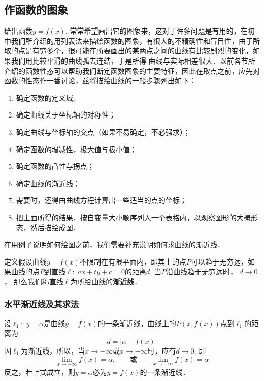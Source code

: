     \subsection{作函数的图象}
    给出函数$y=f(x)$, 常常希望画出它的图象来，这对于许多问题是有用的，在初中我们所介绍的用列表法来描绘函数的图象，有很大的不精确性和盲目性，由于所取的点是有穷多个，很可能在所要画出的某两点之间的曲线有比较剧烈的变化，如果我们用比较平滑的曲线弧去连结，于是所得
    曲线与实际相差很大．以前各节所介绍的函数性态可以帮助我们断定函数图象的主要特征，因此在取点之前，应先对函数的性态作一番讨论，兹将描绘曲线的一般步骤列出如下：
    
    \begin{enumerate}
    \item 确定函数的定义域;
    \item 确定曲线关于坐标轴的对称性；
    \item 确定曲线与坐标轴的交点（如果不易确定，不必强求）；
    \item 确定函数的增减性，极大值与极小值；
    \item 确定函数的凸性与拐点；
    \item 确定曲线的渐近线；
    \item 需要时，还得由曲线方程计算出一些适当的点的坐标；
    \item 把上面所得的结果，按自变量大小顺序列入一个表格内，以观察图形的大概形态，然后描绘成图．
    \end{enumerate}
    
    在用例子说明如何绘图之前，我们需要补充说明如何求曲线的渐近线．
    
    \begin{blk}
        {定义}假设曲线$y=f(x)$不限制在有限平面内，即其上的点$P$可以趋于无穷远，如果曲线的点$P$到直线$\ell:\; ax+ty+c=0$的距离$d$, 当$P$沿曲线趋于无穷远时，
        $d\to 0$，
        那么我们称直线$\ell$为所给曲线的\textbf{渐近线}．
    \end{blk}
    
    \subsubsection{水平渐近线及其求法}
    
    设$\ell_1:\; y=\alpha$是曲线$y=f(x)$的一条渐近线，曲线上的$P(x,f(x))$点到$\ell_1$的距离为
    \[d=|\alpha-f(x)|\]
    因$\ell_1$为渐近线，所以，当$x\to +\infty$或$x\to -\infty$时，应有$d\to 0$, 即
    \[\lim_{x\to+\infty}f(x)=\alpha,\qquad \text{或}\qquad \lim_{x\to -\infty}f(x)=\alpha\]
    反之，若上式成立，则$y=\alpha$必为$y=f(x)$的一条渐近线．
    

